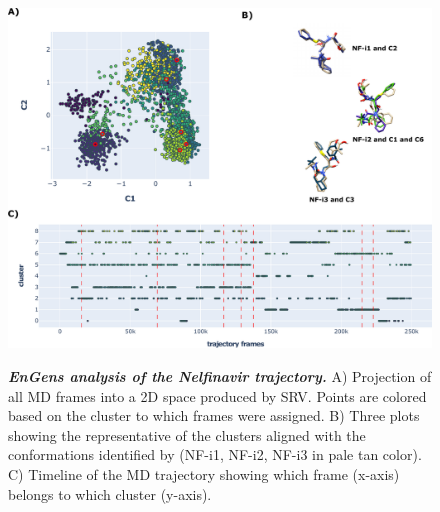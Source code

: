 \documentclass[numsec,webpdf,contemporary,large]{oup-authoring-template}
\theoremstyle{thmstyleone}%
\theoremstyle{thmstyletwo}%
\theoremstyle{thmstylethree}%
\begin{document}
\begin{figure}[!t]%
\centering
{\includegraphics[scale=0.5]{nelfinavir.pdf}}
\caption{\textbf{\textit{EnGens analysis of the Nelfinavir trajectory. }} A) Projection of all MD frames into a 2D space produced by SRV. Points are colored based on the cluster to which frames were assigned. B) Three plots showing the representative of the clusters aligned with the conformations identified by \cite{antunes_new_2014} (NF-i1, NF-i2, NF-i3 in pale tan color). C) Timeline of the MD trajectory showing which frame (x-axis) belongs to which cluster (y-axis).}
\label{fig-res3}
\end{figure}
\end{document}
